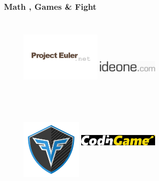 \documentclass{beamer}
\begin{document}

\begin{frame}
	\frametitle{Math , Games \& Fight}
	
	\begin{figure}
	\center
	\href{https://projecteuler.net/archives} {\includegraphics[width=4cm,height=4cm,keepaspectratio]{images/judges/projecteuler}}
	\href{http://ideone.com/}{\includegraphics[width=3cm,height=3cm,keepaspectratio]{images/tools/ideone}}
	\end{figure}
	\begin{figure}
	\center
	\href{https://codefights.com/}{\includegraphics[width=3cm,height=3cm,keepaspectratio]{images/judges/codefights}}
	\href{https://www.codingame.com/start}{\includegraphics[width=4cm,height=4cm,keepaspectratio]{images/judges/codingame}}
	\end{figure}

\end{frame}
\end{document}
